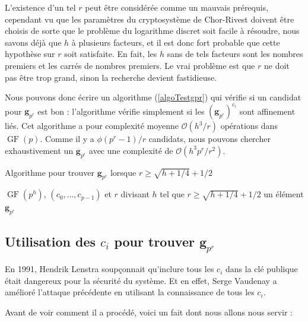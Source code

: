 \documentclass[a4paper, titlepage, 11pt]{article}
\theoremstyle{definition}
\theoremstyle{remark}
\def\O{\mathcal O}
\def\gf{\operatorname{GF}}
\def\mbf#1{\mathbf{#1}}
\begin{document}
L'existence d'un tel $r$ peut être considérée comme un mauvais prérequis, cependant vu que les paramètres du cryptosystème de Chor-Rivest doivent être choisis de sorte que le problème du logarithme discret soit facile à résoudre, nous savons déjà que $h$ à plusieurs facteurs, et il est donc fort probable que cette hypothèse sur $r$ soit satisfaite. En fait, les $h$ sans de tels facteurs sont les nombres premiers et les carrés de nombres premiers. Le vrai problème est que $r$ ne doit pas être trop grand, sinon la recherche devient fastidieuse.

Nous pouvons donc écrire un algorithme (\ref{algoTestgpr}) qui vérifie si un candidat pour $\mbf g_{p^r}$ est bon : l'algorithme vérifie simplement si les $(\mbf g_{p^r})^{c_i}$ sont affinement liés. Cet algorithme a pour complexité moyenne $\O(h^3/r)$ opérations dans $\gf(p)$. Comme il y a $\phi(p^r-1)/r$ candidats, nous pouvons chercher exhaustivement un $\mbf g_{p^r}$ avec une complexité de $\O(h^3p^r/r^2)$.

\begin{algorithm}[h]
\caption{Algorithme pour trouver $\mbf g_{p^r}$ lorsque $r\geqslant \sqrt{h + 1/4} + 1/2$}
\label{algoTestgpr}
\begin{algorithmic}[1]
\REQUIRE $\gf(p^h)$, $(c_0,\dots, c_{p-1})$ et $r$ divisant $h$ tel que $r\geqslant \sqrt{h + 1/4} + 1/2$
\ENSURE un élément $\mbf g_{p^r}$
\FORALL{$\zeta \in \gf(p^h)$ générateur de $\gf(p^r)^\times$} \label{algoTestgprboucle}
		\ENDIF
	\ENDFOR
	\RETURN{$\zeta$}
\ENDFOR
\end{algorithmic}
\end{algorithm}

\subsection*{Utilisation des $c_i$ pour trouver $\mbf g_{p^r}$}

En 1991, Hendrik Lenstra \cite{lenstra1991} soupçonnait qu'inclure tous les $c_i$ dans la clé publique était dangereux pour la sécurité du système. Et en effet, Serge Vaudenay a amélioré l'attaque précédente en utilisant la connaissance de tous les $c_i$. 

Avant de voir comment il a procédé, voici un fait dont nous allons nous servir :
\end{document}
